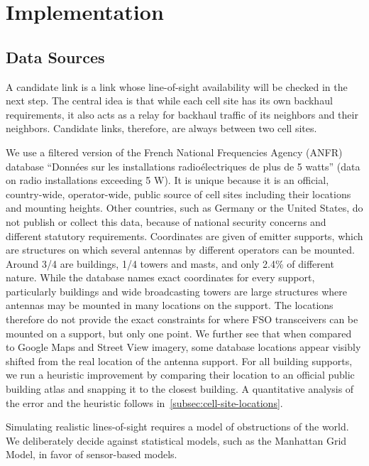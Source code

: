 \section{Implementation}\label{sec:implementation}

\subsection*{Data Sources}\label{subsec:data-sources}
A candidate link is a link whose line-of-sight availability will be checked in the next step.
The central idea is that while each cell site has its own backhaul requirements, it also acts as a relay for backhaul traffic of its neighbors and their neighbors.
Candidate links, therefore, are always between two cell sites.

We use a filtered version of the French National Frequencies Agency (ANFR) database ``Données sur les installations radioélectriques de plus de 5 watts'' (data on radio installations exceeding 5 W). It is unique because it is an official, country-wide, operator-wide, public source of cell sites including their locations and mounting heights.
Other countries, such as Germany or the United States, do not publish or collect this data, because of national security concerns and different statutory requirements.
Coordinates are given of emitter supports, which are structures on which several antennas by different operators can be mounted.
Around 3/4 are buildings, 1/4 towers and masts, and only 2.4\% of different nature.
While the database names exact coordinates for every support, particularly buildings and wide broadcasting towers are large structures where antennas may be mounted in many locations on the support.
The locations therefore do not provide the exact constraints for where FSO transceivers can be mounted on a support, but only one point.
We further see that when compared to Google Maps and Street View imagery, some database locations appear visibly shifted from the real location of the antenna support.
For all building supports, we run a heuristic improvement by comparing their location to an official public building atlas and snapping it to the closest building.
A quantitative analysis of the error and the heuristic follows in~\cref{subsec:cell-site-locations}.

Simulating realistic lines-of-sight requires a model of obstructions of the world.
We deliberately decide against statistical models, such as the Manhattan Grid Model, in favor of sensor-based models.

